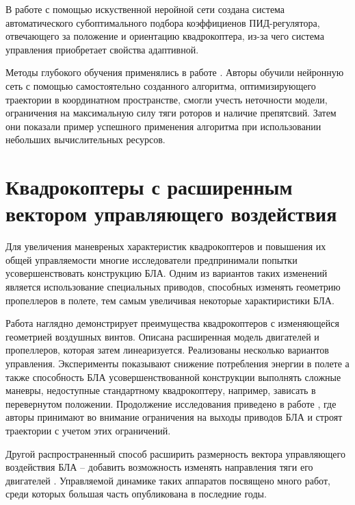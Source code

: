 В работе \cite{Evgenov01} с помощью искуственной неройной сети создана система автоматического субоптимального подбора коэффициенов ПИД-регулятора, отвечающего за положение и ориентацию квадрокоптера, из-за чего система управления приобретает свойства адаптивной.

Методы глубокого обучения применялись в работе \cite{Andersson01}. Авторы обучили нейронную сеть с помощью самостоятельно созданного алгоритма, оптимизирующего траектории в координатном пространстве, смогли учесть неточности модели, ограничения на максимальную силу тяги роторов и наличие препятсвий.
Затем они показали пример успешного применения алгоритма при использовании небольших вычислительных ресурсов.

\section{Квадрокоптеры с расширенным вектором управляющего воздействия}

Для увеличения маневреных характеристик квадрокоптеров и повышения их общей управляемости многие исследователи предпринимали попытки усовершенствовать конструкцию БЛА. Одним из вариантов таких изменений является использование специальных приводов, способных изменять геометрию пропеллеров в полете, тем самым увеличивая некоторые характиристики БЛА.

Работа \cite{Cutler01} наглядно демонстрирует преимущества квадрокоптеров с изменяющейся геометрией воздушных винтов. Описана расширенная модель двигателей и пропеллеров, которая затем линеаризуется. Реализованы несколько вариантов управления. Эксперименты показывают снижение потребления энергии в полете а также способность БЛА усовершенствованной конструкции выполнять сложные маневры, недоступные стандартному квадрокоптеру, например, зависать в перевернутом положении. Продолжение исследования приведено в работе \cite{Cutler02}, где авторы принимают во внимание ограничения на выходы приводов БЛА и строят траектории с учетом этих ограничений.

Другой распространенный способ расширить размерность вектора управляющего воздействия БЛА -- добавить возможность изменять направления тяги его двигателей \cite{Papachristos01, Gupta01, Lin01, Dharmawan01}. Управляемой динамике таких аппаратов посвящено много работ, среди которых большая часть опубликована в последние годы.

